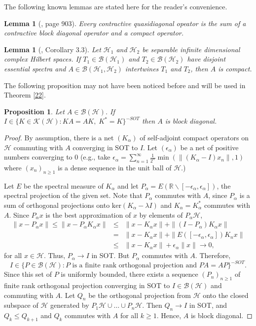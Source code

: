 \documentclass[11pt]{amsart}
\newtheorem{lemma}[theorem]{Lemma}
\newtheorem{proposition}[theorem]{Proposition}
\theoremstyle{definition}
\numberwithin{equation}{section}
\begin{document}
The following known lemmas are stated here for the reader's convenience.
\begin{lemma}[\cite{Halmos}, page 903]\label{11}
Every contractive quasidiagonal opeator is the sum of a contractive block diagonal operator and a compact operator.
\end{lemma}
\begin{lemma}[\cite{Rosenblum}, Corollary 3.3]\label{12}
Let $\mathcal{H}_{1}$ and $\mathcal{H}_{2}$ be separable infinite dimensional complex Hilbert spaces. If $T_{1}\in\mathcal{B}(\mathcal{H}_{1})$ and $T_{2}\in \mathcal{B}(
\mathcal{H}_{2})$ have disjoint essential spectra and $A\in\mathcal{B}(\mathcal{H}_{1},\mathcal{H}_{2})$ intertwines $T_{1}$ and $T_{2}$, then $A$ is compact.
\end{lemma}
The following proposition may not have been noticed before and will be used in Theorem \ref{22}.
\begin{proposition}\label{13}
Let $A\in \mathcal{B(H)}$. If $I\in\{K\in \mathcal{K(H)}:KA=AK,\;K^{*}=K\}^{-SOT}$ then $A$ is block diagonal.
\end{proposition}
\begin{proof}
By assumption, there is a net $(K_{\alpha})$ of self-adjoint compact operators on $\mathcal{H}$ commuting with $A$ converging in SOT to $I$. Let $(\epsilon_{\alpha})$ be a
net of positive numbers converging to 0 (e.g., take $\epsilon_{\alpha}=\sum_{n=1}^{\infty}\frac{1}{2^{n}}\min(\|(K_{\alpha}-I)x_{n}\|,1)$ where $(x_{n})_{n\geq 1}$ is a
dense sequence in the unit ball of $\mathcal{H}$.)

Let $E$ be the spectral measure of $K_{\alpha}$ and let $P_{\alpha}=E(\mathbb{R}\backslash[-\epsilon_{\alpha},\epsilon_{\alpha}])$, the spectral projection of the given
set. Note that $P_{\alpha}$ commutes with $A$, since $P_{\alpha}$ is a sum of orthogonal projections onto $\text{ker}(K_{\alpha}-\lambda I)$ and $K_{\alpha}=K_{\alpha}^{*
}$ commutes with $A$. Since $P_{\alpha}x$ is the best approximation of $x$ by elements of $P_{\alpha}\mathcal{H}$,
\begin{eqnarray*}
\|x-P_{\alpha}x\|\leq\|x-P_{\alpha}K_{\alpha}x\|&\leq&\|x-K_{\alpha}x\|+\|(I-P_{\alpha})K_{\alpha}x\|\\&=&\|x-K_{\alpha}x\|+\|E([-\epsilon_{\alpha},\epsilon_{\alpha}])K_{n
}x\|\\&\leq&\|x-K_{\alpha}x\|+\epsilon_{\alpha}\|x\|\to 0,
\end{eqnarray*}
for all $x\in\mathcal{H}$. Thus, $P_{\alpha}\to I$ in SOT. But $P_{\alpha}$ commutes with $A$. Therefore,
\[I\in\{P\in\mathcal{B(H)}:P\text{ is a finite rank orthogonal projection and }PA=AP\}^{-SOT}.\]
Since this set of $P$ is uniformly bounded, there exists a sequence $(P_{n})_{n\geq 1}$ of finite rank orthogonal projection converging in SOT to $I\in\mathcal{B(H)}$ and
commuting with $A$. Let $Q_{n}$ be the orthogonal projection from $\mathcal{H}$ onto the closed subspace of $\mathcal{H}$ generated by $P_{1}\mathcal{H}\cup\ldots\cup
P_{n}\mathcal{H}$. Then $Q_{n}\to I$ in SOT, and $Q_{k}\leq Q_{k+1}$ and $Q_{k}$ commutes with $A$ for all $k\geq 1$. Hence, $A$ is block diagonal.
\end{proof}
\end{document}
